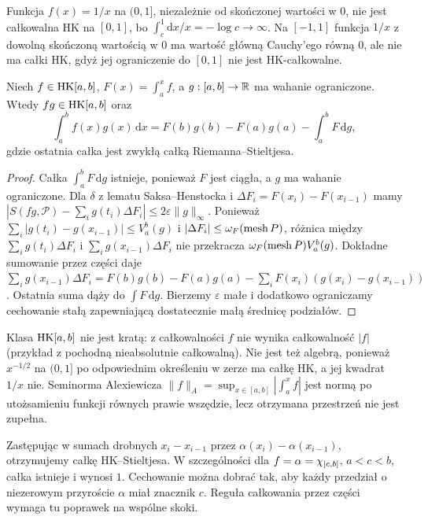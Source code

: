 \begin{przyklad}
Funkcja $f(x)=1/x$ na $(0,1]$, niezależnie od skończonej wartości w $0$, nie jest całkowalna HK na $[0,1]$, bo $\int_c^1\mathrm dx/x=-\log c\to\infty$. Na $[-1,1]$ funkcja $1/x$ z dowolną skończoną wartością w $0$ ma wartość główną Cauchy'ego równą $0$, ale nie ma całki HK, gdyż jej ograniczenie do $[0,1]$ nie jest HK-całkowalne.
\end{przyklad}
\begin{twierdzenie}
Niech $f\in\mathrm{HK}[a,b]$, $F(x)=\int_a^x f$, a $g:[a,b]\to\mathbb R$ ma wahanie ograniczone. Wtedy $fg\in\mathrm{HK}[a,b]$ oraz
\[
\int_a^b f(x)g(x)\,\mathrm dx=F(b)g(b)-F(a)g(a)-\int_a^b F\,\mathrm dg,
\]
gdzie ostatnia całka jest zwykłą całką Riemanna--Stieltjesa.
\end{twierdzenie}
\begin{proof}
Całka $\int_a^b F\,\mathrm dg$ istnieje, ponieważ $F$ jest ciągła, a $g$ ma wahanie ograniczone. Dla $\delta$ z lematu Saksa--Henstocka i $\Delta F_i=F(x_i)-F(x_{i-1})$ mamy
$|S(fg,\mathcal P)-\sum_i g(t_i)\Delta F_i|\le2\varepsilon\|g\|_\infty$.
Ponieważ $\sum_i|g(t_i)-g(x_{i-1})|\le V_a^b(g)$ i $|\Delta F_i|\le\omega_F(\operatorname{mesh} P)$, różnica między $\sum_i g(t_i)\Delta F_i$ i $\sum_i g(x_{i-1})\Delta F_i$ nie przekracza $\omega_F(\operatorname{mesh} P)V_a^b(g)$. Dokładne sumowanie przez części daje
$\sum_i g(x_{i-1})\Delta F_i=F(b)g(b)-F(a)g(a)-\sum_iF(x_i)(g(x_i)-g(x_{i-1}))$.
Ostatnia suma dąży do $\int F\,\mathrm dg$. Bierzemy $\varepsilon$ małe i dodatkowo ograniczamy cechowanie stałą zapewniającą dostatecznie małą średnicę podziałów.
\end{proof}
\begin{uwaga}
Klasa $\mathrm{HK}[a,b]$ nie jest kratą: z całkowalności $f$ nie wynika całkowalność $|f|$ (przykład z pochodną nieabsolutnie całkowalną). Nie jest też algebrą, ponieważ $x^{-1/2}$ na $(0,1]$ po odpowiednim określeniu w zerze ma całkę HK, a jej kwadrat $1/x$ nie. Seminorma Alexiewicza $\|f\|_A=\sup_{x\in[a,b]}\left|\int_a^x f\right|$ jest normą po utożsamieniu funkcji równych prawie wszędzie, lecz otrzymana przestrzeń nie jest zupełna.
\end{uwaga}
\begin{uwaga}
Zastępując w sumach drobnych $x_i-x_{i-1}$ przez $\alpha(x_i)-\alpha(x_{i-1})$, otrzymujemy całkę HK--Stieltjesa. W szczególności dla $f=\alpha=\chi_{[c,b]}$, $a<c<b$, całka istnieje i wynosi $1$. Cechowanie można dobrać tak, aby każdy przedział o niezerowym przyroście $\alpha$ miał znacznik $c$. Reguła całkowania przez części wymaga tu poprawek na wspólne skoki.
\end{uwaga}

